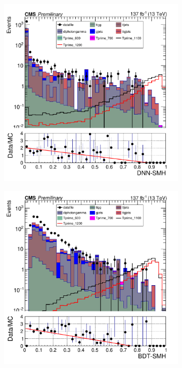 \begin{figure}[H]
     \centering
     \begin{subfigure}[b]{0.47\textwidth}
         \centering
         \includegraphics[width=\textwidth]{figure_4/Stacked_plot_DNN_1100-1200_with_diphoton_cuts.pdf}
         \label{fig:y equals x}
     \end{subfigure}
     \hfill
     \begin{subfigure}[b]{0.47\textwidth}
         \centering
         \includegraphics[width=\textwidth]{BDT_Output/Stacked_plot_BDT_1100-1200_with_diphoton_cuts_inputs.pdf}

\end{subfigure}
\end{figure}
